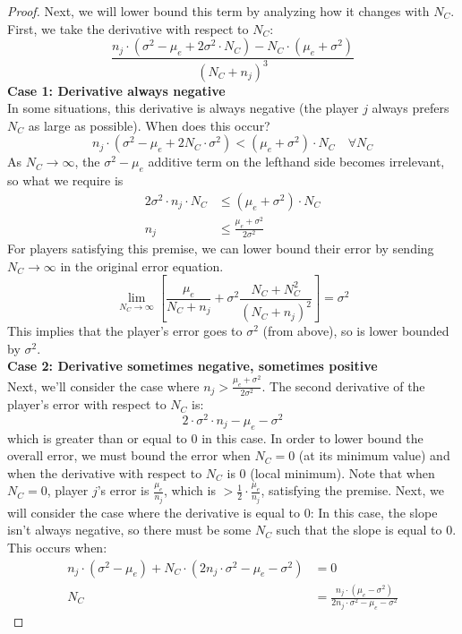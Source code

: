 \documentclass{article}
\newcommand{\br}[1]{\left[ #1 \right]}
\newcommand{\cd}[0]{\cdot}
\newcommand{\mue}[0]{\ensuremath{\mu_e}}
\newcommand{\var}[0]{\ensuremath{\sigma^2}}
\newcommand{\ndraw}[0]{\ensuremath{n}}
\newcommand{\total}[0]{\ensuremath{N}}
\newcommand{\col}[0]{\ensuremath{C}}
\begin{document}
\begin{proof}
Next, we will lower bound this term by analyzing how it changes with $\total_{\col}$. First, we take the derivative with respect to $\total_\col$: 
$$\frac{\ndraw_j \cd (\var - \mue + 2 \var \cd \total_{\col})  -\total_\col \cd (\mue+ \var)}{(\total_\col + \ndraw_j)^3}$$
\textbf{Case 1: Derivative always negative}\\
In some situations, this derivative is always negative (the player $j$ always prefers $\total_\col$ as large as possible). When does this occur? 
$$\ndraw_j \cd (\var - \mue + 2\total_\col \cd \var) < (\mue + \var) \cd \total_\col \quad \forall\total_{\col}$$
As $\total_{\col} \rightarrow \infty$, the $\var - \mue$ additive term on the lefthand side becomes irrelevant, so what we require is 
\begin{align*}
2 \var \cd \ndraw_j\cd \total_{\col} & \leq (\mue + \var) \cd \total_{\col}\\
\ndraw_j  &\leq \frac{\mue + \var}{2 \var}
\end{align*}
For players satisfying this premise, we can lower bound their error by sending $\total_\col \rightarrow \infty$ in the original error equation. 
$$\lim_{\total_{\col}\rightarrow \infty}\br{\frac{\mue}{\total_\col + \ndraw_j} + \var \frac{\total_\col + \total_\col^2}{(\total_\col + \ndraw_j)^2}} = \var $$
This implies that the player's error goes to $\var$ (from above), so is lower bounded by $\var$. \\
\textbf{Case 2: Derivative sometimes negative, sometimes positive}\\
Next, we'll consider the case where $\ndraw_j >\frac{\mue + \var}{2 \var}$. The second derivative of the player's error with respect to $\total_{\col}$ is: 
$$2 \cd \var \cd \ndraw_j - \mue - \var$$
which is greater than or equal to 0 in this case. In order to lower bound the overall error, we must bound the error when $\total_{\col}=0$ (at its minimum value) and when the derivative with respect to $\total_{\col}$ is 0 (local minimum). Note that when $\total_{\col} = 0$, player $j$'s error is $\frac{\mue}{\ndraw_j}$, which is $> \frac{1}{2} \cd \frac{\mue}{\ndraw_j}$, satisfying the premise. Next, we will consider the case where the derivative is equal to 0: In this case, the slope isn't always negative, so there must be some $\total_\col$ such that the slope is equal to 0. This occurs when: 
\begin{align*}
\ndraw_j \cd (\var - \mue) + \total_\col \cd (2 \ndraw_j \cd \var -\mue - \var)&=0\\  
\total_\col &= \frac{\ndraw_j \cd (\mue - \var)}{2 \ndraw_j \cd \var - \mue - \var}

\end{align*}
\end{proof}
\end{document}
